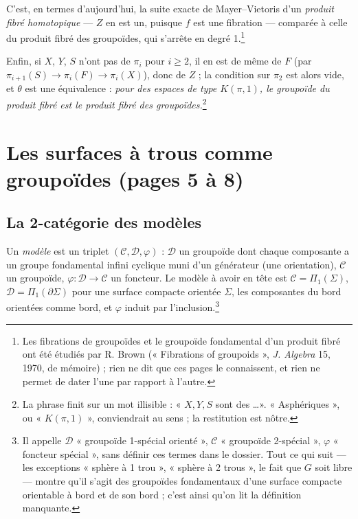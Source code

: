 \documentclass[11pt,a4paper]{article}
\begin{document}
C'est, en termes d'aujourd'hui, la suite exacte de Mayer--Vietoris d'un
\emph{produit fibré homotopique} — $Z$ en est un, puisque $f$ est une
fibration — comparée à celle du produit fibré des groupoïdes, qui s'arrête
en degré 1.\footnote{Les fibrations de groupoïdes et le groupoïde fondamental
d'un produit fibré ont été étudiés par R. Brown (« Fibrations of groupoids »,
\emph{J. Algebra} 15, 1970, de mémoire) ; rien ne dit que ces pages le
connaissent, et rien ne permet de dater l'une par rapport à l'autre.}

Enfin, si $X$, $Y$, $S$ n'ont pas de $\pi_i$ pour $i \geqslant 2$, il en est
de même de $F$ (par $\pi_{i+1}(S) \to \pi_i(F) \to \pi_i(X)$), donc de $Z$ ;
la condition sur $\pi_2$ est alors vide, et $\theta$ est une équivalence :
\emph{pour des espaces de type $K(\pi, 1)$, le groupoïde du produit fibré est
le produit fibré des groupoïdes.}\footnote{La phrase finit sur un mot
illisible : « $X, Y, S$ sont des \dots ». « Asphériques », ou « $K(\pi,1)$ »,
conviendrait au sens ; la restitution est nôtre.}

\section*{Les surfaces à trous comme groupoïdes (pages 5 à 8)}

\subsection*{La 2-catégorie des modèles}

Un \emph{modèle} est un triplet $(\mathcal{C}, \mathcal{D}, \varphi)$ :
$\mathcal{D}$ un groupoïde dont chaque composante a un groupe fondamental
infini cyclique muni d'un générateur (une orientation),
$\mathcal{C}$ un groupoïde, $\varphi : \mathcal{D} \to \mathcal{C}$ un
foncteur. Le modèle à avoir en tête est
$\mathcal{C} = \Pi_1(\Sigma)$, $\mathcal{D} = \Pi_1(\partial\Sigma)$ pour une
surface compacte orientée $\Sigma$, les composantes du bord orientées comme
bord, et $\varphi$ induit par l'inclusion.\footnote{Il appelle $\mathcal{D}$
« groupoïde 1-spécial orienté », $\mathcal{C}$ « groupoïde 2-spécial »,
$\varphi$ « foncteur spécial », sans définir ces termes dans le dossier.
Tout ce qui suit — les exceptions « sphère à 1 trou », « sphère à 2 trous »,
le fait que $G$ soit libre — montre qu'il s'agit des groupoïdes fondamentaux
d'une surface compacte orientable à bord et de son bord ; c'est ainsi qu'on
lit la définition manquante.}
\end{document}
